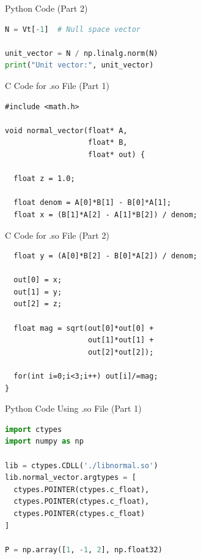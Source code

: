 \documentclass{beamer}
\begin{document}
\begin{frame}[fragile]{Python Code (Part 2)}
\begin{lstlisting}[language=Python]
N = Vt[-1]  # Null space vector

unit_vector = N / np.linalg.norm(N)
print("Unit vector:", unit_vector)
\end{lstlisting}
\end{frame}


\begin{frame}[fragile]{C Code for .so File (Part 1)}
\begin{lstlisting}
#include <math.h>

void normal_vector(float* A,
                   float* B,
                   float* out) {

  float z = 1.0;

  float denom = A[0]*B[1] - B[0]*A[1];
  float x = (B[1]*A[2] - A[1]*B[2]) / denom;
\end{lstlisting}
\end{frame}

\begin{frame}[fragile]{C Code for .so File (Part 2)}
\begin{lstlisting}
  float y = (A[0]*B[2] - B[0]*A[2]) / denom;

  out[0] = x;
  out[1] = y;
  out[2] = z;

  float mag = sqrt(out[0]*out[0] +
                   out[1]*out[1] +
                   out[2]*out[2]);

  for(int i=0;i<3;i++) out[i]/=mag;
}
\end{lstlisting}
\end{frame}





\begin{frame}[fragile]{Python Code Using .so File (Part 1)}
\begin{lstlisting}[language=Python]
import ctypes
import numpy as np

lib = ctypes.CDLL('./libnormal.so')
lib.normal_vector.argtypes = [
  ctypes.POINTER(ctypes.c_float),
  ctypes.POINTER(ctypes.c_float),
  ctypes.POINTER(ctypes.c_float)
]

P = np.array([1, -1, 2], np.float32)
\end{lstlisting}
\end{frame}
\end{document}
